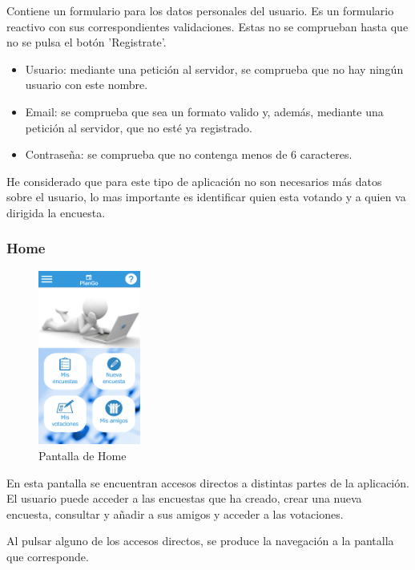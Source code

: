 \documentclass[a4paper, 12pt]{book}
\begin{document}
Contiene un formulario para los datos personales del usuario. Es un formulario reactivo
con sus correspondientes validaciones. Estas no se comprueban hasta que no se pulsa el bot\'on
'Registrate'.

\begin{itemize}
\item Usuario: mediante una petici\'on al servidor, se comprueba que no hay ning\'un usuario con
este nombre.
\item Email: se comprueba que sea un formato valido y, adem\'as, mediante una petici\'on al
servidor, que no est\'e ya registrado.
\item Contrase\~na: se comprueba que no contenga menos de 6 caracteres.

\end{itemize}

He considerado que para este tipo de aplicaci\'on no son necesarios m\'as datos sobre el
usuario, lo mas importante es identificar quien esta votando y a quien va dirigida la encuesta.

\subsubsection{Home}
\label{sec:home}

\begin{figure}[H]
  \centering
  \includegraphics[width=0.3\textwidth]{img/home.png}
  \caption{Pantalla de Home}
  \label{figura:home}
\end{figure}

En esta pantalla se encuentran accesos directos a distintas partes de la aplicaci\'on. El usuario
puede acceder a las encuestas que ha creado, crear una nueva encuesta, consultar y a\~nadir a sus
amigos y acceder a las votaciones.

Al pulsar alguno de los accesos directos, se produce la navegaci\'on a la pantalla que corresponde.
\end{document}
